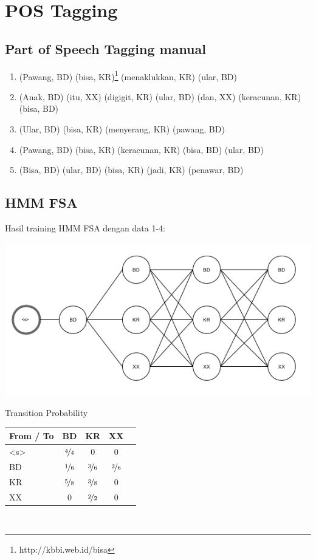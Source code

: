\documentclass[paper=a4, fontsize=11pt]{scrartcl} %
\numberwithin{equation}{section} %
\numberwithin{figure}{section} %
\numberwithin{table}{section} %
\begin{document}

\section{POS Tagging}

\subsection{Part of Speech Tagging manual}

\begin{enumerate}
	\item (Pawang, BD) (bisa, KR)\footnote{http://kbbi.web.id/bisa} (menaklukkan, KR) (ular, BD)
	\item (Anak, BD) (itu, XX) (digigit, KR) (ular, BD) (dan, XX) (keracunan, KR) (bisa, BD)
	\item (Ular, BD) (bisa, KR) (menyerang, KR) (pawang, BD)
	\item (Pawang, BD) (bisa, KR) (keracunan, KR) (bisa, BD) (ular, BD)
	\item (Bisa, BD) (ular, BD) (bisa, KR) (jadi, KR) (penawar, BD)
\end{enumerate}

\subsection{HMM FSA}
Hasil training HMM FSA dengan data 1-4:

\includegraphics[scale=0.8]{hmm_fsa_pos_tagging_training}

Transition Probability \\
\begin{tabular}{ | l | c | c | c | c |}
\hline
From / To & BD & KR & XX \\ \hline
<s> & $\nicefrac{4}{4}$ & 0 & 0\\ \hline
BD & $\nicefrac{1}{6}$ & $\nicefrac{3}{6}$ & $\nicefrac{2}{6}$ \\ \hline
KR & $\nicefrac{5}{8}$ & $\nicefrac{3}{8}$ & 0 \\ \hline
XX & 0 & $\nicefrac{2}{2}$ & 0 \\ \hline
\end{tabular} \\ [8pt]
\end{document}

